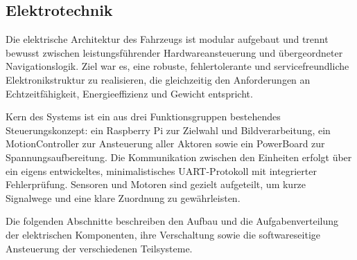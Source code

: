 \documentclass[main.tex]{subfiles} %
\begin{document}

\subsection{Elektrotechnik}

Die elektrische Architektur des Fahrzeugs ist modular aufgebaut und trennt bewusst 
zwischen leistungsführender Hardwareansteuerung und übergeordneter Navigationslogik. 
Ziel war es, eine robuste, fehlertolerante und servicefreundliche Elektronikstruktur 
zu realisieren, die gleichzeitig den Anforderungen an Echtzeitfähigkeit, 
Energieeffizienz und Gewicht entspricht.

Kern des Systems ist ein aus drei Funktionsgruppen bestehendes Steuerungskonzept: 
ein Raspberry Pi zur Zielwahl und Bildverarbeitung, ein MotionController zur 
Ansteuerung aller Aktoren sowie ein PowerBoard zur Spannungsaufbereitung. Die 
Kommunikation zwischen den Einheiten erfolgt über ein eigens entwickeltes, 
minimalistisches UART-Protokoll mit integrierter Fehlerprüfung. Sensoren und Motoren 
sind gezielt aufgeteilt, um kurze Signalwege und eine klare Zuordnung zu gewährleisten.

Die folgenden Abschnitte beschreiben den Aufbau und die Aufgabenverteilung der 
elektrischen Komponenten, ihre Verschaltung sowie die softwareseitige Ansteuerung 
der verschiedenen Teilsysteme.


\newpage


\newpage


\newpage


\newpage


\newpage


\newpage


\newpage
\end{document}
